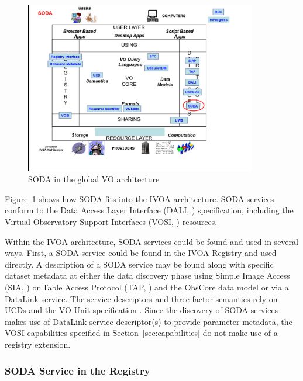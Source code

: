 \documentclass[11pt,a4paper]{ivoa}
\begin{document}
\begin{figure}
\centering

\includegraphics[width=0.9\textwidth]{archdiag.png}
\caption{SODA in the global VO architecture}
\label{fig:architecture}
\end{figure}

Figure~\ref{fig:architecture} shows how SODA fits into the IVOA architecture.
SODA services conform to the Data Access Layer Interface (DALI,
\citet{2013ivoa.spec.1129D}) specification, 
including the Virtual Observatory Support Interfaces (VOSI,
\citet{2011ivoa.spec.0531G}) resources.

Within the IVOA architecture, SODA services could be found and used in
several ways. First, a SODA service could be found in the IVOA Registry
and used directly. A description of a SODA service may be found along
with specific dataset metadata at either the data discovery phase using
Simple Image Access (SIA, \citet{2015ivoa.spec.1223D}) or Table Access Protocol
(TAP, \citet{2010ivoa.spec.0327D}) and the ObsCore data model \citep{2011ivoa.spec.1028T} or
via a DataLink \citep{2015ivoa.spec.0617D} service. The service descriptors and
three-factor semantics rely on UCDs \citep{2005ivoa.spec.1231D} and the VO Unit
specification \citep{2014ivoa.spec.0523D}. Since the discovery of SODA services
makes use of DataLink service descriptor(s) to provide parameter
metadata, the VOSI-capabilities specified in
Section~\ref{sec:capabilities} do not make use of a registry extension.

\subsubsection{SODA Service in the Registry}
\end{document}
